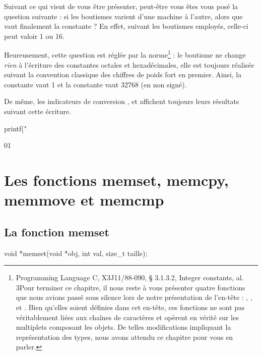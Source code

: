 Suivant ce qui vient de vous être présenter, peut-être vous êtes vous
posé la question suivante : si les boutismes varient d'une machine à
l'autre, alors que vaut finalement la constante  ? En
effet, suivant les boutismes employés, celle-ci peut valoir 1 ou 16.

Heureusement, cette question est réglée par la norme\footnote{Programming
  Language C, X3J11/88-090, § 3.1.3.2, Integer constants, al. 3Pour
  terminer ce chapitre, il nous reste à vous présenter quatre fonctions
  que nous avions passé sous silence lors de notre présentation de
  l'en-tête  :
  , ,  et
  . Bien qu'elles soient définies dans cet en-tête, ces
  fonctions ne sont pas véritablement liées aux chaînes de caractères et
  opèrent en vérité sur les multiplets composant les objets. De telles
  modifications impliquant la représentation des types, nous avons
  attendu ce chapitre pour vous en parler.} : le boutisme ne change
\emph{rien} à l'écriture des constantes octales et hexadécimales, elle
est toujours réalisée suivant la convention classique des chiffres de
poids fort en premier. Ainsi, la constante  vaut 1 et la
constante  vaut 32768 (en non signé).

De même, les indicateurs de conversion ,  et
 affichent toujours leurs résultats suivant cette écriture.

\begin{C}
printf("%
\end{C}

\begin{C}
 01
\end{C}

\section{Les fonctions memset, memcpy, memmove et memcmp}
\label{les-fonctions-memset,-memcpy,-memmove-et-memcmp}

\subsection{La fonction memset}
\label{la-fonction-memset}

\begin{C}
void *memset(void *obj, int val, size_t taille);
\end{C}

